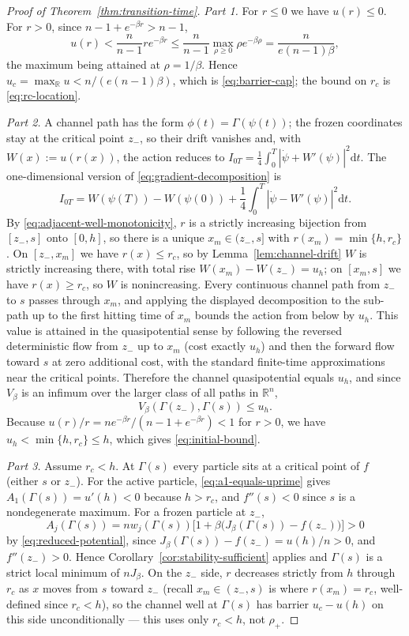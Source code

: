 \documentclass{article} %
\newcommand{\dd}{\mathrm d}
\theoremstyle{plain}
\theoremstyle{definition}
\theoremstyle{remark}
\newcommand{\prefactor}[2]{A_{#1}(#2)}
\newcommand{\R}{\mathbb{R}}
\begin{document}
\begin{proof}[Proof of Theorem~\ref{thm:transition-time}]
    \emph{Part 1.} For $r\le0$ we have $u(r)\le0$. For $r>0$, since $n-1+e^{-\beta r}>n-1$,
    \[
        u(r)<\frac{n}{n-1}re^{-\beta r}\le\frac{n}{n-1}\max_{\rho\ge0}\rho e^{-\beta\rho}=\frac{n}{e(n-1)\beta},
    \]
    the maximum being attained at $\rho=1/\beta$. Hence $u_c=\max_\R u<n/(e(n-1)\beta)$, which is \eqref{eq:barrier-cap}; the bound on $r_c$ is \eqref{eq:rc-location}.

    \emph{Part 2.} A channel path has the form $\phi(t)=\Gamma(\psi(t))$; the frozen coordinates stay at the critical point $z_-$, so their drift vanishes and, with $W(x):=u(r(x))$, the action reduces to $I_{0T}=\frac14\int_0^T|\dot\psi+W'(\psi)|^2\dd t$. The one-dimensional version of \eqref{eq:gradient-decomposition} is
    \[
        I_{0T}=W(\psi(T))-W(\psi(0))+\frac14\int_0^T|\dot\psi-W'(\psi)|^2\dd t.
    \]
    By \eqref{eq:adjacent-well-monotonicity}, $r$ is a strictly increasing bijection from $[z_-,s]$ onto $[0,h]$, so there is a unique $x_m\in(z_-,s]$ with $r(x_m)=\min\{h,r_c\}$. On $[z_-,x_m]$ we have $r(x)\le r_c$, so by Lemma~\ref{lem:channel-drift} $W$ is strictly increasing there, with total rise $W(x_m)-W(z_-)=u_h$; on $[x_m,s]$ we have $r(x)\ge r_c$, so $W$ is nonincreasing. Every continuous channel path from $z_-$ to $s$ passes through $x_m$, and applying the displayed decomposition to the sub-path up to the first hitting time of $x_m$ bounds the action from below by $u_h$. This value is attained in the quasipotential sense by following the reversed deterministic flow from $z_-$ up to $x_m$ (cost exactly $u_h$) and then the forward flow toward $s$ at zero additional cost, with the standard finite-time approximations near the critical points. Therefore the channel quasipotential equals $u_h$, and since $V_\beta$ is an infimum over the larger class of all paths in $\R^n$,
    \[
        V_\beta(\Gamma(z_-),\Gamma(s))\le u_h.
    \]
    Because $u(r)/r=ne^{-\beta r}/(n-1+e^{-\beta r})<1$ for $r>0$, we have $u_h<\min\{h,r_c\}\le h$, which gives \eqref{eq:initial-bound}.

    \emph{Part 3.} Assume $r_c<h$. At $\Gamma(s)$ every particle sits at a critical point of $f$ (either $s$ or $z_-$). For the active particle, \eqref{eq:a1-equals-uprime} gives $\prefactor{1}{\Gamma(s)}=u'(h)<0$ because $h>r_c$, and $f''(s)<0$ since $s$ is a nondegenerate maximum. For a frozen particle at $z_-$,
    \[
        \prefactor{j}{\Gamma(s)} = nw_j(\Gamma(s))\bigl[1+\beta\bigl(J_\beta(\Gamma(s))-f(z_-)\bigr)\bigr]>0
    \]
    by \eqref{eq:reduced-potential}, since $J_\beta(\Gamma(s))-f(z_-)=u(h)/n>0$, and $f''(z_-)>0$. Hence Corollary~\ref{cor:stability-sufficient} applies and $\Gamma(s)$ is a strict local minimum of $nJ_\beta$. On the $z_-$ side, $r$ decreases strictly from $h$ through $r_c$ as $x$ moves from $s$ toward $z_-$ (recall $x_m\in(z_-,s)$ is where $r(x_m)=r_c$, well-defined since $r_c<h$), so the channel well at $\Gamma(s)$ has barrier $u_c-u(h)$ on this side unconditionally --- this uses only $r_c<h$, not $\rho_+$.


\end{proof}
\end{document}
